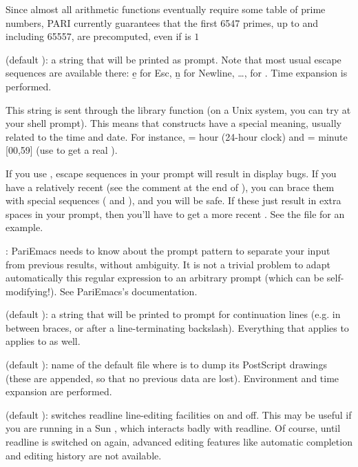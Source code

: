 Since almost all arithmetic functions eventually require some table of prime
numbers, PARI currently guarantees that the first 6547 primes, up to and
including 65557, are precomputed, even if  is $1$

 (default ): a string that will be printed as
prompt. Note that most usual escape sequences are available there: \b{e} for
Esc, \b{n} for Newline, \dots, \kbd{\bs\bs} for \kbd{\bs}. Time expansion is
performed.

This string is sent through the library function  (on a
Unix system, you can try  at your shell prompt). This means
that \kbd{\%} constructs have a special meaning, usually related to the time
and date. For instance,  = hour (24-hour clock) and  =
minute [00,59] (use \kbd{\%\%} to get a real \kbd{\%}).

If you use , escape sequences in your prompt will result in
display bugs. If you have a relatively recent  (see the comment
at the end of ), you can brace them with special sequences
(\kbd{\bs[} and \kbd{\bs]}), and you will be safe. If these just result in
extra spaces in your prompt, then you'll have to get a more recent
. See the file  for an example.

: PariEmacs needs to know about the prompt pattern to
separate your input from previous  results, without ambiguity. It is
not a trivial problem to adapt automatically this regular expression to an
arbitrary prompt (which can be self-modifying!). See PariEmacs's
documentation.

 (default ): a string that will be printed
to prompt for continuation lines (e.g. in between braces, or after a
line-terminating backslash). Everything that applies to 
applies to  as well.

 (default ): name of the default file where
 is to dump its PostScript drawings (these are appended, so that no
previous data are lost). Environment and time expansion are performed.

 (default ): switches readline line-editing
facilities on and off. This may be useful if you are running  in a Sun
, which interacts badly with readline. Of course, until readline
is switched on again, advanced editing features like automatic completion
and editing history are not available.

